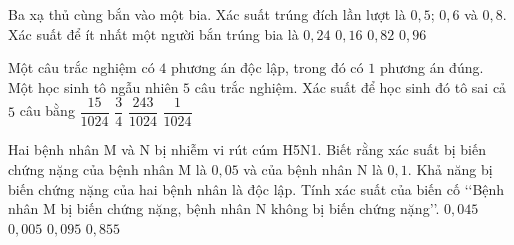 \begin{ex}%
	Ba xạ thủ cùng bắn vào một bia. Xác  suất trúng đích lần lượt là $0{,}5$; $0{,}6$ và $0{,}8$. Xác suất để ít nhất một người bắn trúng bia là
	 \choice
		 {$0{,}24$}
		{$0{,}16$} 
		 {$0{,}82$}
		 {\True $0{,}96$}
\end{ex}

\begin{ex}%
	Một câu trắc nghiệm có $4$ phương án độc lập, trong đó có $1$ phương án đúng. Một học sinh tô ngẫu nhiên $5$  câu trắc nghiệm. Xác suất để học sinh đó tô sai cả $5$ câu bằng
	\choice 
		{$\dfrac{15}{1024}$} 
		{$\dfrac{3}{4}$} 
		{\True  $\dfrac{243}{1024}$}
		 {$\dfrac{1}{1024}$}
\end{ex}

\begin{ex}%
	Hai bệnh nhân M và N bị  nhiễm vi rút cúm H5N1. Biết rằng xác suất bị biến chứng nặng của bệnh nhân M là $0{,}05$ và của bệnh nhân N là $0{,}1$. Khả năng bị biến chứng nặng của hai bệnh nhân là độc lập. Tính xác suất của biến cố \lq\lq Bệnh nhân M bị biến chứng nặng, bệnh nhân N không bị biến chứng nặng\rq\rq.
	 \choice
		{\True  $0{,}045$}
		 {$0{,}005$}
		 {$0{,}095$}
		 {$0{,}855$}
\end{ex}

